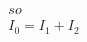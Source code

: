 \documentclass[preview]{standalone}
\begin{document}
\begin{align*}
so \\ I_0 = I_1 + I_2
\end{align*}
\end{document}
